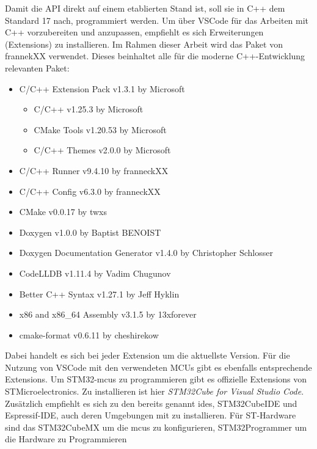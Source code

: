 Damit die API direkt auf einem etablierten Stand ist, soll sie in C++ dem Standard 17 nach, programmiert werden.
Um über VSCode für das Arbeiten mit C++ vorzubereiten und anzupassen, empfiehlt es sich Erweiterungen (Extensions) zu installieren.
Im Rahmen dieser Arbeit wird das Paket von frannekXX verwendet.
Dieses beinhaltet alle für die moderne C++-Entwicklung relevanten Paket:
\begin{itemize}
	\item C/C++ Extension Pack  v1.3.1 by Microsoft
	\begin{itemize}
		\item C/C++  v1.25.3  by Microsoft		
		\item CMake Tools  v1.20.53  by Microsoft
		\item C/C++ Themes  v2.0.0 by Microsoft 
	\end{itemize}
	\item C/C++ Runner  v9.4.10 by franneckXX
	\item C/C++ Config  v6.3.0 by franneckXX
	\item CMake  v0.0.17 by twxs
	\item Doxygen  v1.0.0 by Baptist BENOIST
	\item Doxygen Documentation Generator  v1.4.0 by Christopher Schlosser
	\item CodeLLDB  v1.11.4 by Vadim Chugunov
	\item Better C++ Syntax  v1.27.1  by Jeff Hyklin
	\item x86 and x86\_64 Assembly  v3.1.5 by 13xforever
	\item cmake-format  v0.6.11 by cheshirekow
\end{itemize}

Dabei handelt es sich bei jeder Extension um die aktuellste Version.
Für die Nutzung von VSCode mit den verwendeten MCUs gibt es ebenfalls entsprechende Extensions.
Um STM32-\gls{mcu}s zu programmieren gibt es offizielle Extensions von\\STMicroelectronics.
Zu installieren ist hier \emph{STM32Cube for Visual Studio Code}.
Zusätzlich empfiehlt es sich zu den bereits genannt \gls{ide}s, STM32CubeIDE und Espressif-IDE, auch deren Umgebungen mit zu installieren.
Für ST-Hardware sind das STM32CubeMX um die \gls{mcu}s zu konfigurieren, STM32Programmer um die Hardware zu Programmieren %

